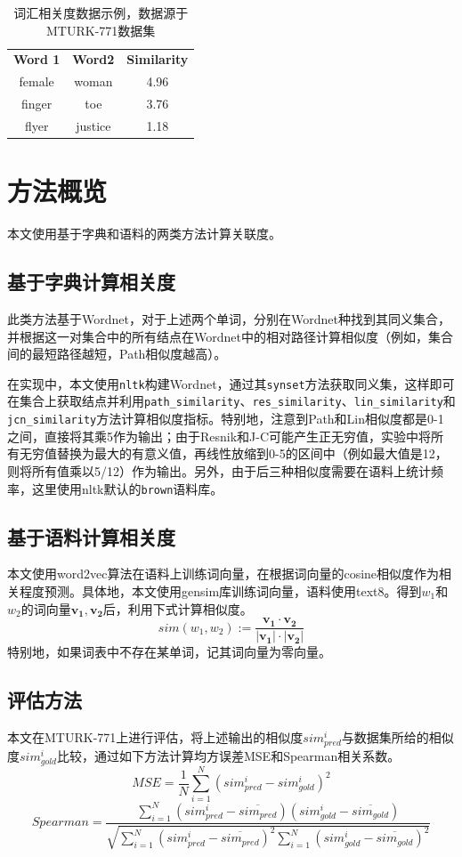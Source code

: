 \documentclass{article}
\begin{document}
\begin{table}[h]
  \centering
  \begin{tabular}{c c c}
    \toprule
    \bfseries Word 1 & \bfseries Word2 & \bfseries Similarity \\
    \cmidrule(lr){1-3}
    female & woman & 4.96 \\
    finger & toe & 3.76 \\
    flyer & justice & 1.18\\
    \bottomrule
  \end{tabular}
  \caption{词汇相关度数据示例，数据源于MTURK-771数据集}
  \label{tab:dataset_eg}
\end{table}

\section{方法概览}
本文使用基于字典和语料的两类方法计算关联度。
\subsection{基于字典计算相关度}
此类方法基于Wordnet，对于上述两个单词，分别在Wordnet种找到其同义集合，并根据这一对集合中的所有结点在Wordnet中的相对路径计算相似度（例如，集合间的最短路径越短，Path相似度越高）。

在实现中，本文使用\texttt{nltk}构建Wordnet，通过其\texttt{synset}方法获取同义集，这样即可在集合上获取结点并利用\texttt{path\_similarity}、\texttt{res\_similarity}、\texttt{lin\_similarity}和\texttt{jcn\_similarity}方法计算相似度指标。特别地，注意到Path和Lin相似度都是0-1之间，直接将其乘5作为输出；由于Resnik和J-C可能产生正无穷值，实验中将所有无穷值替换为最大的有意义值，再线性放缩到0-5的区间中（例如最大值是12，则将所有值乘以5/12）作为输出。另外，由于后三种相似度需要在语料上统计频率，这里使用nltk默认的\texttt{brown}语料库。

\subsection{基于语料计算相关度}
本文使用word2vec算法在语料上训练词向量，在根据词向量的cosine相似度作为相关程度预测。具体地，本文使用gensim库训练词向量，语料使用text8。得到$w_1$和$w_2$的词向量$\mathbf{v_1}, \mathbf{v_2}$后，利用下式计算相似度。
\[ sim(w_1, w_2) := \frac{\mathbf{v_1}\cdot \mathbf{v_2}}{|\mathbf{v_1}|\cdot |\mathbf{v_2}|} \]
特别地，如果词表中不存在某单词，记其词向量为零向量。

\subsection{评估方法}
本文在MTURK-771上进行评估，将上述输出的相似度$sim_{pred}^i$与数据集所给的相似度$sim_{gold}^i$比较，通过如下方法计算均方误差MSE和Spearman相关系数。
\[ MSE = \frac{1}{N} \sum\limits_{i=1}^{N} {(sim_{pred}^i-sim_{gold}^i)}^2 \]
\[ Spearman = \frac{\sum\limits_{i=1}^N (sim_{pred}^i - \overline{sim_{pred}})(sim_{gold}^i - \overline{sim_{gold}})}{\sqrt{\sum\limits_{i=1}^N {(sim_{pred}^i - \overline{sim_{pred}})}^2  \sum\limits_{i=1}^N {(sim_{gold}^i - \overline{sim_{gold}})}^2}} \]
\end{document}
